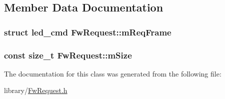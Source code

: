 \subsection{Member Data Documentation}
\hypertarget{class_fw_request_a1aefbfbc115ce21f8816c8a458108263}{
\subsubsection[{m\-Req\-Frame}]{\setlength{\rightskip}{0pt plus 5cm}struct led\-\_\-cmd Fw\-Request\-::m\-Req\-Frame\hspace{0.3cm}{\ttfamily [protected]}}}\label{class_fw_request_a1aefbfbc115ce21f8816c8a458108263}
\hypertarget{class_fw_request_a5f44d41f56901e8b61ee9390c0af8eca}{
\subsubsection[{m\-Size}]{\setlength{\rightskip}{0pt plus 5cm}const size\-\_\-t Fw\-Request\-::m\-Size\hspace{0.3cm}{\ttfamily [protected]}}}\label{class_fw_request_a5f44d41f56901e8b61ee9390c0af8eca}


The documentation for this class was generated from the following file\-:\begin{DoxyCompactItemize}
\item 
library/\hyperlink{_fw_request_8h}{Fw\-Request.\-h}\end{DoxyCompactItemize}
